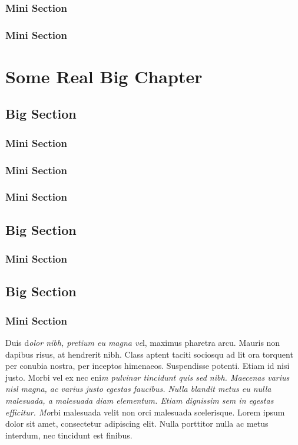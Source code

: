 \documentclass[12pt,a4paper]{report}
\begin{document}
\subsection{Mini Section}
\subsection{Mini Section}
\chapter{Some Real Big Chapter}
\section{Big Section}
\subsection{Mini Section}
\subsection{Mini Section}
\subsection{Mini Section}
\section{Big Section}
\subsection{Mini Section}
\section{Big Section}
\subsection{Mini Section}

Duis d\emph{olor nibh, pretium eu magna ve}l, maximus pharetra arcu. Mauris non dapibus risus, at hendrerit nibh. Class aptent {\color{minor} taciti sociosqu ad lit    ora torquent per conubia nostra, per inceptos himenaeos. Suspendisse potenti. Etiam }id nisi justo. Morbi vel ex nec eni\emph{m pulvinar tincidunt quis sed nibh. Maecenas varius nisl magna, ac varius justo egestas faucibus. Nulla blandit metus eu nulla malesuada, a malesuada diam elementum. Etiam dignissim sem in egestas efficitur. Mo}rbi malesuada velit non orci malesuada scelerisque. Lorem ipsum dolor sit amet, consectetur adipiscing {\color{minimal} elit. Nulla porttitor nulla ac metus interdum, nec tincidunt est finibus.}
\end{document}
